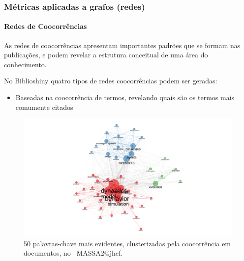\subsubsection{Métricas aplicadas a grafos (redes)}

\paragraph{Redes de Coocorrências}

As redes de coocorrências apresentam importantes padrões que se formam nas publicações, e podem revelar a estrutura conceitual de uma área do conhecimento.

No Biblioshiny quatro tipos de redes coocorrências podem ser geradas:
\begin{itemize}
    \item Baseadas na coocorrência de termos, revelando quais são os termos mais comumente citados 
\end{itemize}

\begin{figure}
    \centering
    \includegraphics[width=1\textwidth]{experiments/jhcf/PesqBibliogr/SimulacaoMultiagente/WoS-20220203/Estrutura/Conceitual/MASSA2-Co-occurrence-Network-50nodes-louvainclustering.png.png}
    \caption{50 palavras-chave mais evidentes, clusterizadas pela coocorrência em documentos, no  \dataset\ MASSA2@jhcf.}
    \label{fig:MASSA2-Co-occurrence-Network-50nodes-louvainclustering.png}
\end{figure}

